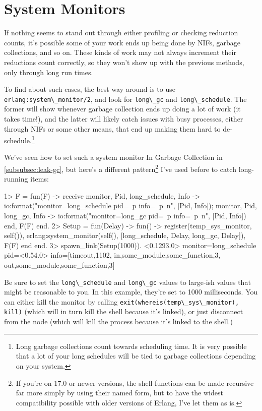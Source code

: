 \documentclass[11pt, oneside]{book}   	%
\newcommand{\function}[1]{\Verb`#1`}
\newcommand{\expression}[1]{\Verb`#1`}
\newcommand{\term}[1]{\Verb`#1`}
\begin{document}
\section{System Monitors}
\label{sec:cpu-system-monitors}

If nothing seems to stand out through either profiling or checking reduction counts, it's possible some of your work ends up being done by NIFs, garbage collections, and so on. These kinds of work may not always increment their reductions count correctly, so they won't show up with the previous methods, only through long run times.

To find about such cases, the best way around is to use \function{erlang:system\_monitor/2}, and look for \term{long\_gc} and \term{long\_schedule}. The former will show whenever garbage collection ends up doing a lot of work (it takes time!), and the latter will likely catch issues with busy processes, either through NIFs or some other means, that end up making them hard to de-schedule.\footnote{Long garbage collections count towards scheduling time. It is very possible that a lot of your long schedules will be tied to garbage collections depending on your system.}

We've seen how to set such a system monitor In Garbage Collection in \ref{subsubsec:leak-gc}, but here's a different pattern\footnote{If you're on 17.0 or newer versions, the shell functions can be made recursive far more simply by using their named form, but to have the widest compatibility possible with older versions of Erlang, I've let them as is.} I've used before to catch long-running items:

\begin{VerbatimEshell}
1> F = fun(F) ->
    receive
        {monitor, Pid, long_schedule, Info} ->
            io:format("monitor=long_schedule pid=~p info=~p~n", [Pid, Info]);
        {monitor, Pid, long_gc, Info} -> 
            io:format("monitor=long_gc pid=~p info=~p~n", [Pid, Info])
    end,
    F(F)
end.
2> Setup = fun(Delay) -> fun() -> 
     register(temp_sys_monitor, self()),
     erlang:system_monitor(self(), [{long_schedule, Delay}, {long_gc, Delay}]),
     F(F)
end end.
3> spawn_link(Setup(1000)).
<0.1293.0>
monitor=long_schedule pid=<0.54.0> info=[{timeout,1102},
                                         {in,{some_module,some_function,3}},
                                         {out,{some_module,some_function,3}}]
\end{VerbatimEshell}

Be sure to set the \term{long\_schedule} and \term{long\_gc} values to large-ish values that might be reasonable to you. In this example, they're set to 1000 milliseconds. You can either kill the monitor by calling \expression{exit(whereis(temp\_sys\_monitor), kill)} (which will in turn kill the shell because it's linked), or just disconnect from the node (which will kill the process because it's linked to the shell.)
\end{document}
